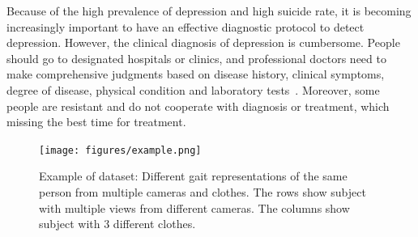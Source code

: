 \documentclass[10pt,twocolumn,letterpaper]{article}
\def\confName{CVPR}
\def\confYear{2023}
\begin{document}


Because of the high prevalence of depression and high suicide rate, it is becoming increasingly important to have an effective diagnostic protocol to detect depression. However, the clinical diagnosis of depression is cumbersome. People should go to designated hospitals or clinics, and professional doctors need to make comprehensive judgments based on disease history, clinical symptoms, degree of disease, physical condition and laboratory tests~\cite{faust1988expert}. Moreover, some people are resistant and do not cooperate with diagnosis or treatment, which missing the best time for treatment.



\begin{figure}[t]
  \centering
   \texttt{[image: figures/example.png]}

   \caption{Example of dataset: Different gait representations of the same person from multiple cameras and clothes.
   The rows show subject with multiple views from different cameras. The columns show subject with 3 different clothes.
   }
   \label{Introduction}
\end{figure}

\end{document}
